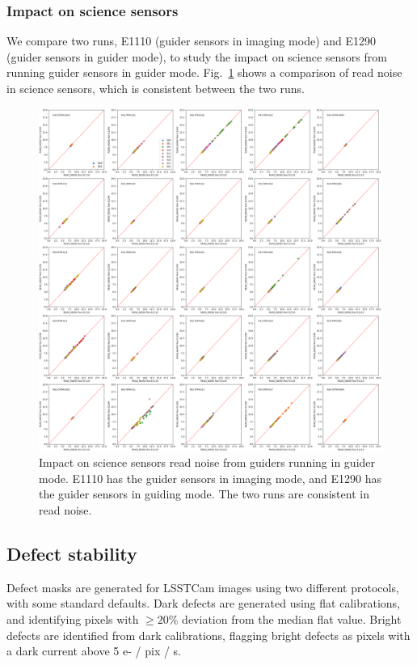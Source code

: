\subsubsection*{Impact on science sensors}\label{sec:guiderimpactonscience}
We compare two runs, E1110 (guider sensors in imaging mode) and E1290 (guider sensors in guider mode), to study the impact on science sensors from running guider sensors in guider mode. Fig.~\ref{fig:guider_noise} shows a comparison of read noise in science sensors, which is consistent between the two runs.
\begin{figure}
    \centering
    \includegraphics[width=0.95\linewidth]{figures/E1110_E1290_READ_NOISE.png}
    \caption{Impact on science sensors read noise from guiders running in guider mode. E1110 has the guider sensors in imaging mode, and E1290 has the guider sensors in guiding mode. The two runs are consistent in read noise.}
    \label{fig:guider_noise}
\end{figure}

\subsection{Defect stability}\label{defect-stability}

Defect masks are generated for LSSTCam images using two different protocols, with some standard defaults. Dark defects are generated using flat calibrations, and identifying pixels with $\geq 20\%$ deviation from the median flat value. Bright defects are identified from dark calibrations, flagging bright defects as pixels with a dark current above 5 e- / pix / s.

